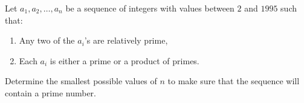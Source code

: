 Let $a_1,a_2,\ldots,a_n$ be a sequence of integers with values between $2$ and $1995$ such that:
\begin{enumerate}[label=(\roman*)]
	\item Any two of the $a_i$'s are relatively prime,
	\item Each $a_i$ is either a prime or a product of primes.
\end{enumerate}
Determine the smallest possible values of $n$ to make sure that the sequence will contain a prime number.